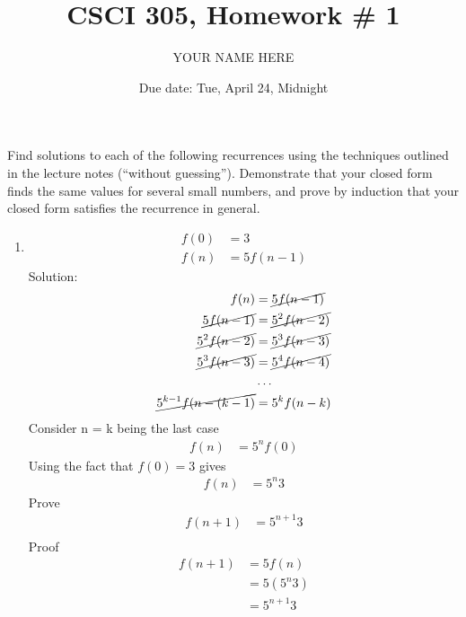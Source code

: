 \documentclass{article}
\title{CSCI 305, Homework \# 1}
\author{YOUR NAME HERE}
\date{Due date: Tue, April 24, Midnight}
\begin{document}
\maketitle

Find solutions to each of the following recurrences
using the techniques outlined in the lecture notes (``without guessing'').
Demonstrate that your closed form finds the same values for several
small numbers, and prove by induction that your closed form satisfies
the recurrence in general.

\begin{enumerate}
\item
  \begin{align*}
    f(0) &= 3\\
    f(n) &= 5f(n-1)
  \end{align*}
  Solution:
  \begin{align*}
    f(n) &= \cancel{5f(n-1)}\\
    \cancel{5f(n-1)} &= \cancel{5^2f(n-2)}\\
    \cancel{5^2f(n-2)} &= \cancel{5^3f(n-3)}\\
    \cancel{5^3f(n-3)} &= \cancel{5^4f(n-4)}\\
    &\ldots\\
    \cancel{5^{k-1}f(n-(k-1)} &= 5^{k}f(n-k)
  \end{align*}
    Consider n = k being the last case
  \begin{align*}
    f(n) &= 5^{n}f(0)
  \end{align*}
  Using the fact that $f(0)=3$ gives 
  \begin{align*}
    f(n) &= 5^{n}3
  \end{align*}
  Prove
  \begin{align*}
    f(n + 1) &= 5^{n + 1}3 \\
  \end{align*}    
  Proof
  \begin{align*}
    f(n + 1) &= 5f(n) \\    
    &= 5(5^n3) \\
    &= 5^{n + 1}3 \\
  \end{align*}



\end{enumerate}
\end{document}
